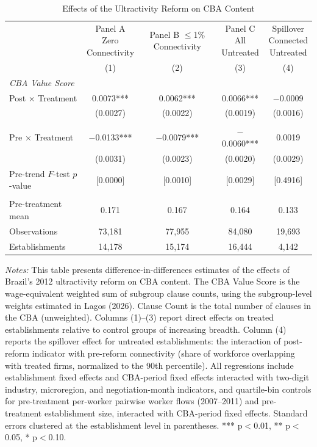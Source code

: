 \documentclass[12pt,letterpaper]{article}
\begin{document}
\begin{table}[H]
\centering
\caption{Effects of the Ultractivity Reform on CBA Content}
\label{tab:cba_value}
\scriptsize
\begin{threeparttable}
\begin{tabular}{l cccc}
\toprule\toprule
 & \shortstack{Panel A\\Zero\\Connectivity} & \shortstack{Panel B\\$\leq$1\%\\Connectivity} & \shortstack{Panel C\\All\\Untreated} & \shortstack{Spillover\\Connected\\Untreated} \\
 & (1) & (2) & (3) & (4) \\
\midrule
\multicolumn{5}{l}{\textit{CBA Value Score}} \\
Post $\times$ Treatment & 0.0073*** & 0.0062*** & 0.0066*** & $-$0.0009 \\
  & (0.0027) & (0.0022) & (0.0019) & (0.0016) \\
 & & & & \\
Pre $\times$ Treatment & $-$0.0133*** & $-$0.0079*** & $-$0.0060*** & 0.0019 \\
  & (0.0031) & (0.0023) & (0.0020) & (0.0029) \\
Pre-trend $F$-test $p$-value & [0.0000] & [0.0010] & [0.0029] & [0.4916] \\
 & & & & \\
Pre-treatment mean & 0.171 & 0.167 & 0.164 & 0.133 \\
Observations & 73{,}181 & 77{,}955 & 84{,}080 & 19{,}693 \\
Establishments & 14{,}178 & 15{,}174 & 16{,}444 & 4{,}142 \\
\bottomrule
\end{tabular}
\scriptsize
\begin{tablenotes}
\item \textit{Notes:} This table presents difference-in-differences estimates of the effects of Brazil's 2012 ultractivity reform on CBA content. The CBA Value Score is the wage-equivalent weighted sum of subgroup clause counts, using the subgroup-level weights estimated in Lagos (2026). Clause Count is the total number of clauses in the CBA (unweighted). Columns (1)--(3) report direct effects on treated establishments relative to control groups of increasing breadth. Column (4) reports the spillover effect for untreated establishments: the interaction of post-reform indicator with pre-reform connectivity (share of workforce overlapping with treated firms, normalized to the 90th percentile). All regressions include establishment fixed effects and CBA-period fixed effects interacted with two-digit industry, microregion, and negotiation-month indicators, and quartile-bin controls for pre-treatment per-worker pairwise worker flows (2007--2011) and pre-treatment establishment size, interacted with CBA-period fixed effects. Standard errors clustered at the establishment level in parentheses. *** p$<$0.01, ** p$<$0.05, * p$<$0.10.

\end{tablenotes}
\end{threeparttable}
\end{table}
\end{document}
